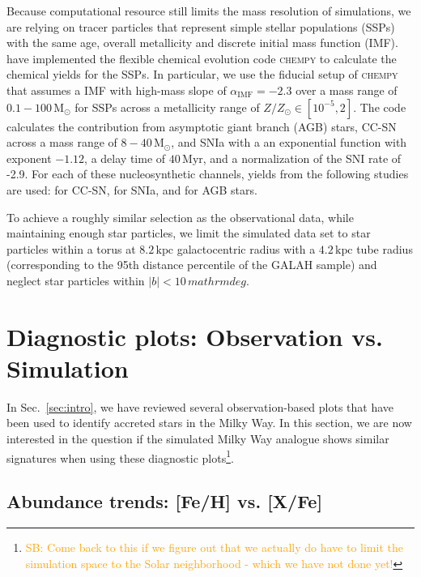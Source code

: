 \documentclass[fleqn,usenatbib]{mnras}
\newcommand{\SB}[1]{{\textcolor{orange}{SB: #1}}}
\begin{document}
Because computational resource still limits the mass resolution of simulations, we are relying on tracer particles that represent simple stellar populations (SSPs) with the same age, overall metallicity and discrete initial mass function (IMF). \citet{Buck2021} have implemented the flexible chemical evolution code \textsc{chempy} \citep{Rybizki2017} to calculate the chemical yields for the SSPs. In particular, we use the fiducial setup of \textsc{chempy} that assumes a \citet{Chabrier2003} IMF with high-mass slope of $\alpha_\text{IMF} = -2.3$ over a mass range of $0.1-100\,\mathrm{M_\odot}$ for SSPs across a metallicity range of $Z/Z_\odot \in [10^{-5},2]$. The code calculates the contribution from asymptotic giant branch (AGB) stars, CC-SN across a mass range of $8-40\,\mathrm{M_\odot}$, and SNIa with a an exponential function with exponent $-1.12$, a delay time of $40\,\mathrm{Myr}$, and a normalization of the SNI rate of -2.9. For each of these nucleosynthetic channels, yields from the following studies are used: \citet{Chieffi2004} for CC-SN, \citet{Seitenzahl2013} for SNIa, and \citet{Karakas2016} for AGB stars.

To achieve a roughly similar selection as the observational data, while maintaining enough star particles, we limit the simulated data set to star particles within a torus at $8.2\,\mathrm{kpc}$ galactocentric radius with a $4.2\,\mathrm{kpc}$ tube radius (corresponding to the 95th distance percentile of the GALAH sample) and neglect star particles within $\vert b \vert < 10\,mathrm{deg}$. %


\section{Diagnostic plots: Observation vs. Simulation}
\label{sec:comparison}

In Sec.~\ref{sec:intro}, we have reviewed several observation-based plots that have been used to identify accreted stars in the Milky Way. In this section, we are now interested in the question if the simulated Milky Way analogue shows similar signatures when using these diagnostic plots\footnote{\SB{Come back to this if we figure out that we actually do have to limit the simulation space to the Solar neighborhood - which we have not done yet!}}.

\subsection{Abundance trends: [Fe/H] vs. [X/Fe]} \label{sec:feh_xfe}
\end{document}

